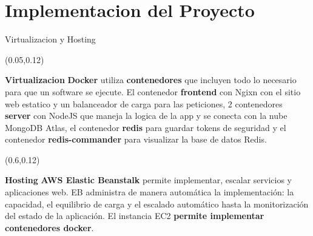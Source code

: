 \documentclass[xcolor=pdftex,dvipsnames,table]{beamer}
\begin{document}
\section{Implementacion del Proyecto}
\begin{frame}{Virtualizacion y Hosting}
\footnotesize

    \begin{textblock*}{0.48\textwidth}(0.05\textwidth,0.12\textwidth)  
            \begin{block}{\textbf{Virtualizacion}} 
                                            \justifying
              \textbf{Docker} utiliza \textbf{contenedores} que incluyen todo lo necesario para que un software se ejecute. El contenedor \textbf{frontend} con Ngixn con el sitio web estatico y un balanceador de carga para las peticiones, 2 contenedores \textbf{server} con NodeJS que maneja la logica de la app y se conecta con la nube MongoDB Atlas, el contenedor \textbf{redis} para guardar tokens de seguridad y el contenedor \textbf{redis-commander} para visualizar la base de datos Redis.
            \end{block} 
    \end{textblock*}
    
    \begin{textblock*}{0.4\textwidth}(0.6\textwidth,0.12\textwidth)  
            \begin{block}{\textbf{Hosting}} 
                                \justifying
                \textbf{AWS Elastic Beanstalk} permite implementar, escalar servicios y aplicaciones web. EB administra de manera automática la implementación: la capacidad, el equilibrio de carga y el escalado automático hasta la monitorización del estado de la aplicación. El instancia EC2 \textbf{permite implementar contenedores docker}.
            \end{block}  
    \end{textblock*}


\end{frame}
\end{document}
